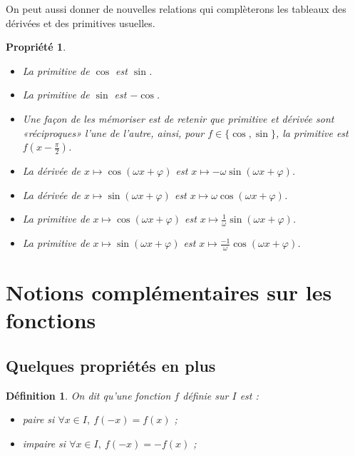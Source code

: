 \documentclass[11pt,a4paper,french]{article}
\theoremstyle{break}
\newtheorem{definition}{Définition}
\newtheorem{propriete}{Propriété}
\theoremstyle{plain}
\theoremstyle{nonumberplain}
\theoremstyle{nonumberbreak}
\begin{document}
On peut aussi donner de nouvelles relations qui complèterons les
tableaux des dérivées et des primitives usuelles.

\begin{propriete}
  \begin{multicols}{2}
    \begin{itemize}
      \item La primitive de $\cos$ est $\sin$.
      \item La primitive de $\sin$ est $-\cos$.
      \item Une façon de les mémoriser est de retenir que primitive et
        dérivée sont «réciproques» l'une de l'autre, ainsi, pour $f\in\{
        \cos,\sin\}$, la primitive est $f(x - \frac{\pi}2)$.
    \end{itemize}
    \columnbreak
    \begin{itemize}
      \item La dérivée de $x\mapsto \cos(\omega x + \varphi)$ est
        $x\mapsto -\omega\sin(\omega x + \varphi)$.
      \item La dérivée de $x\mapsto \sin(\omega x + \varphi)$ est
        $x\mapsto \omega\cos(\omega x + \varphi)$.
      \item La primitive de $x\mapsto \cos(\omega x + \varphi)$ est
        $x\mapsto \frac1{\omega}\sin(\omega x + \varphi)$.
      \item La primitive de $x\mapsto \sin(\omega x + \varphi)$ est
        $x\mapsto \frac{-1}{\omega}\cos(\omega x + \varphi)$.
    \end{itemize}
  \end{multicols}
\end{propriete}

\section{Notions complémentaires sur les fonctions}

\subsection{Quelques propriétés en plus}

\begin{definition}
  On dit qu'une fonction $f$ définie sur $I$ est :
  \begin{itemize}
    \item paire si $\forall x\in I,\ f(-x) = f(x)$ ;
    \item impaire si $\forall x\in I,\ f(-x) = -f(x)$ ;
  \end{itemize}
\end{definition}
\end{document}
